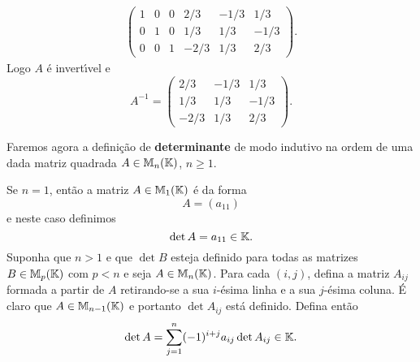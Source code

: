 \begin{exemplo}
\begin{solucao}
\begin{align*}
\begin{pmatrix}
  					1 & 0 & 0 & 2/3 & -1/3 & 1/3 \\
   					0 & 1 & 0 & 1/3 & 1/3 & -1/3\\
   					0 & 0 & 1 & -2/3 & 1/3 & 2/3
     			\end{pmatrix}.
		\end{align*}
		Logo $A$ \'e invert{\'\i}vel e
		\[
			A^{-1} = \begin{pmatrix}
  						2/3 & -1/3 & 1/3 \\
   						1/3 & 1/3 & -1/3\\
   						-2/3 & 1/3 & 2/3
     			\end{pmatrix}.
		\]
	\end{solucao}
\end{exemplo}

Faremos agora a defini\c{c}\~ao de \textbf{determinante} de modo indutivo na ordem de uma dada matriz quadrada $A \in \mathbb{M}_n(\mathbb{K})$, $n \ge 1$.

Se $n = 1$, ent\~ao a matriz $A \in \mathbb{M}_1(\mathbb{K})$ \'e da forma
\[
	A = (a_{11})
\]
e neste caso definimos
\[
	\det A = a_{11} \in \mathbb{K}.
\]
Suponha que $n > 1$ e que $\det B$ esteja definido para todas as matrizes  $B \in \mathbb{M}_p(\mathbb{K})$ com $p < n$ e seja 
$A \in \mathbb{M}_n(\mathbb{K})$. Para cada $(i,j)$, defina a matriz $A_{ij}$ formada a partir de $A$ retirando-se a sua $i$-\'esima linha e a sua $j$-\'esima coluna. \'E claro que $A \in \mathbb{M}_{n - 1}(\mathbb{K})$ e portanto $\det A_{ij}$ est\'a definido. Defina ent\~ao
\[
	\det A = \sum_{j = 1}^n(-1)^{i + j}a_{ij}\det A_{ij} \in \mathbb{K}.
\]

